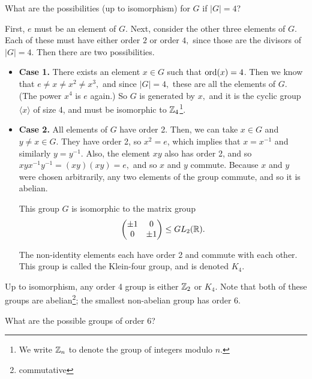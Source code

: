 \begin{example}
What are the possibilities (up to isomorphism) for $G$ if $|G| = 4$?

First, $e$ must be an element of $G$. Next, consider the other three elements of $G$. Each of these must have either order $2$ or order $4,$ since those are the divisors of $|G| = 4.$ Then there are two possibilities. 

\begin{itemize}
    \item \textbf{Case 1.} There exists an element $x \in G$ such that $\operatorname{ord}(x) = 4$. Then we know that $e \neq x \neq x^2 \neq x^3,$ and since $|G| = 4,$ these are all the elements of $G$. (The power $x^4$ is $e$ again.) So $G$ is generated by $x,$ and it is the cyclic group $\langle x \rangle$ of size 4, and must be isomorphic to $\mathbb Z_4$\footnote{We write $\mathbb Z_n$ to denote the group of integers modulo $n$.}.
    
    \item \textbf{Case 2.} All elements of $G$ have order 2. Then, we can take $x \in G$ and $y \neq x \in G.$ They have order 2, so $x^2 = e$, which implies that $x = x^{-1}$ and similarly $y = y^{-1}.$ Also, the element $xy$ also has order 2, and so $xyx^{-1}y^{-1} = (xy)(xy) = e,$ and so $x$ and $y$ commute. Because $x$ and $y$ were chosen arbitrarily, any two elements of the group commute, and so it is abelian. 

    This group $G$ is isomorphic to the matrix group
    \[
    \begin{pmatrix}
    \pm 1 & 0 \\
    0 & \pm 1
    \end{pmatrix} 
    \leq GL_2(\mathbb R).
    \]
    
    The non-identity elements each have order 2 and commute with each other. This group is called the Klein-four group, and is denoted $K_4.$
\end{itemize}

Up to isomorphism, any order 4 group is either $\mathbb Z_2$ or $K_4.$ Note that both of these groups are abelian\footnote{commutative}; the smallest non-abelian group has order 6.

\end{example}

\begin{exercise}
What are the possible groups of order 6?
\end{exercise}

